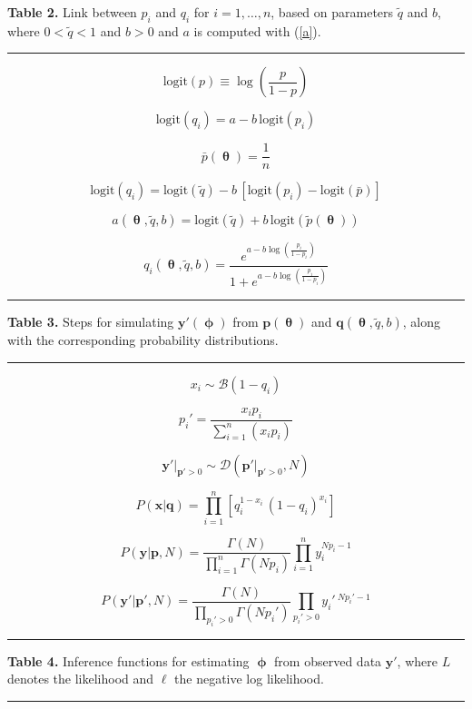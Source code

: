 \documentclass[12pt,fleqn,letterpaper]{article}
\def\noi{\noindent}
\def\newp{\vfill \break}   %
\def\beq{\begin{equation}}
\def\eeq{\end{equation}}
\def\dst{\displaystyle}
\newcommand{\eref}[1]{(\ref{#1})}
\newcounter{saveEq}
\def\putEq{\setcounter{saveEq}{\value{equation}}}
\def\tableEq#1{ %
  \putEq \setcounter{equation}{0}
  \renewcommand{\theequation}{T#1.\arabic{equation}}}
\def\bfp{\mathbf{p}}
\def\bfpp{\mathbf{p'}}
\def\bfq{\mathbf{q}}
\def\bfx{\mathbf{x}}
\def\bfy{\mathbf{y}}
\def\bfyp{\mathbf{y'}}
\def\bfth{\bm{\uptheta}}
\def\bfph{\bm{\upphi}}
\def\Gam{\Gamma}
\def\logit{\mbox{logit}}
\def\Bernou{\mathcal{B}}
\def\Dirich{\mathcal{D}}
\def\ptil{\tilde{p}}
\def\pbar{\bar{p}}
\def\qtil{\tilde{q}}
\begin{document}

\tableEq{2}
\noi \textbf{Table 2.} Link between $p_i$ and $q_i$ for $i=1,\ldots,n$, based on
parameters $\qtil$ and $b$, where $0<\qtil<1$ and $b>0$ and $a$ is computed with \eref{a}. \\ 
\hrule 

\beq \logit(p) \equiv \log \left(\frac{p}{1-p}\right) \label{logit} \eeq

\beq \logit(q_i) = a - b \, \logit(p_i) \label{lqptil} \eeq


\beq \pbar(\bfth) = \frac{1}{n} \label{pbar} \eeq

\beq \logit(q_i) = \logit(\qtil) - b \,[ \logit(p_i) - \logit(\pbar)]
  \label{lqp} \eeq

\beq a(\bfth,\qtil,b) = \logit(\qtil) + b \, \logit(\ptil(\bfth)) \label{a} \eeq

\newcommand{\lgt}[1]
  {\log\left(\frac{#1}{1-#1}\right)}

\beq q_i(\bfth,\qtil,b) = \frac{e^{a-b\lgt{p_i}}}{1 + e^{a-b\lgt{p_i}}} \label{qp} \eeq

\hrule \newp


\tableEq{3}
\noi \textbf{Table 3.} Steps for simulating $\bfyp(\bfph)$ from $\bfp(\bfth)$ and $\bfq(\bfth,\qtil,b)$, along with the corresponding probability distributions. \\ 
\hrule 

\beq x_i \sim \Bernou(1-q_i) \label{xi} \eeq 
 
\beq p_i' = \frac{x_i p_i}{\dst \sum_{i=1}^n (x_i p_i)} \label{pip} \eeq

\beq \bfyp|_{\bfpp>0} \sim \Dirich(\bfpp|_{\bfpp>0},N) \label{yp} \eeq 
 
\beq P(\bfx|\bfq) = \prod_{i=1}^n [q_i^{1-x_i}\, (1-q_i)^{x_i}] \label{Px} \eeq

\beq P(\bfy|\bfp,N)
  = \frac{\Gam(N)}{\dst \prod_{i=1}^n \Gam(Np_i)}
    \prod_{i=1}^n y_i^{Np_i-1}
\label{Pydir} \eeq

\beq P(\bfyp|\bfpp,N)
  = \frac{\Gam(N)}{\dst \prod_{p_i'>0} \Gam(Np_i')}
    \prod_{p_i'>0} y_i'\,^{Np_i'-1}
\label{Pypdir} \eeq

\hrule \vspace*{6ex}


\tableEq{4}
\noi \textbf{Table 4.} Inference functions for estimating $\bfph$ from observed data $\bfyp$, where $L$ denotes the likelihood and $\ell$ the negative log likelihood. \\
\hrule
\end{document}
